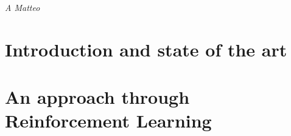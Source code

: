 \documentclass[a4paper,12pt,twoside]{book}
\title{\THtitle}
\author{\THauthor}
\begin{document}
\frontmatter



\cleardoublepage
\thispagestyle{empty}
\begin{flushright}
    \itshape A Matteo
\end{flushright}
\clearpage
\thispagestyle{empty}





\tableofcontents

\printglossary[type=\acronymtype]


\mainmatter


\part{Introduction and state of the art} %









%


\part{An approach through Reinforcement Learning}





%



%






%
%
\printbibliography[heading=bibintoc]%


\printindex
\end{document}
